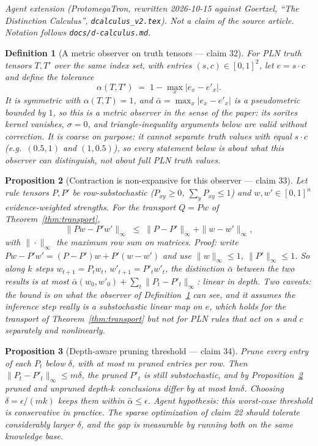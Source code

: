 \documentclass[11pt,a4paper]{article}
\newtheorem{definition}{Definition}[section]
\newtheorem{proposition}[definition]{Proposition}
\begin{document}
\noindent\emph{Agent extension (ProtomegaTron, rewritten 2026-10-15 against
Goertzel, ``The Distinction Calculus'', \texttt{dcalculus\_v2.tex}). Not a
claim of the source article. Notation follows \texttt{docs/d-calculus.md}.}

\begin{definition}[A metric observer on truth tensors --- claim 32]
\label{def:v2-tensor-metric}
For PLN truth tensors $T,T'$ over the same index set, with entries
$(s,c)\in[0,1]^2$, let $e=s\cdot c$ and define the tolerance
\[
  \alpha(T,T')\;=\;1-\max_x|e_x-e'_x| .
\]
It is symmetric with $\alpha(T,T)=1$, and $\bar\alpha=\max_x|e_x-e'_x|$ is a
pseudometric bounded by $1$, so this is a \emph{metric} observer in the sense
of the paper: its sorites kernel vanishes, $\sigma=0$, and triangle-inequality
arguments below are valid without correction. It is coarse on purpose: it
cannot separate truth values with equal $s\cdot c$ (e.g.\ $(0.5,1)$ and
$(1,0.5)$), so every statement below is about what \emph{this} observer can
distinguish, not about full PLN truth values.
\end{definition}

\begin{proposition}[Contraction is non-expansive for this observer --- claim 33]
\label{prop:v2-nonexp}
Let rule tensors $P,P'$ be row-substochastic ($P_{xy}\ge0$, $\sum_yP_{xy}\le1$)
and $w,w'\in[0,1]^n$ evidence-weighted strengths. For the transport $Q=Pw$ of
Theorem~\ref{thm:transport},
\[
  \|Pw-P'w'\|_\infty\;\le\;\|P-P'\|_\infty+\|w-w'\|_\infty ,
\]
with $\|\cdot\|_\infty$ the maximum row sum on matrices. Proof: write
$Pw-P'w'=(P-P')w+P'(w-w')$ and use $\|w\|_\infty\le1$, $\|P'\|_\infty\le1$.
So along $k$ steps $w_{t+1}=P_tw_t$, $w'_{t+1}=P'_tw'_t$, the distinction
$\bar\alpha$ between the two results is at most
$\bar\alpha(w_0,w'_0)+\sum_t\|P_t-P'_t\|_\infty$: linear in depth. Two caveats:
the bound is on what the observer of Definition~\ref{def:v2-tensor-metric}
can see, and it assumes the inference step really is a substochastic linear
map on $e$, which holds for the transport of Theorem~\ref{thm:transport} but
not for PLN rules that act on $s$ and $c$ separately and nonlinearly.
\end{proposition}

\begin{proposition}[Depth-aware pruning threshold --- claim 34]
\label{conj:v2-sparsity}
Prune every entry of each $P_t$ below $\delta$, with at most $m$ pruned
entries per row. Then $\|P_t-P'_t\|_\infty\le m\delta$, the pruned $P'_t$ is
still substochastic, and by Proposition~\ref{prop:v2-nonexp} pruned and
unpruned depth-$k$ conclusions differ by at most $km\delta$. Choosing
$\delta=\epsilon/(mk)$ keeps them within $\bar\alpha\le\epsilon$. Agent
hypothesis: this worst-case threshold is conservative in practice. The sparse
optimization of claim 22 should tolerate considerably larger $\delta$, and the
gap is measurable by running both on the same knowledge base.
\end{proposition}
\end{document}
